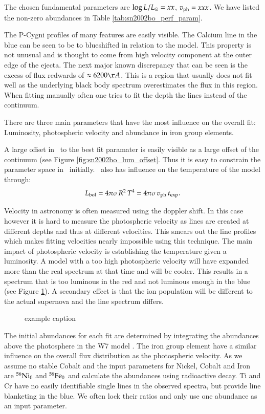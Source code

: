 The chosen fundamental parameters are $\log{L/L_\odot}=xx$, $v_{\rm ph}=xxx$. We have listed the non-zero abundances in Table \ref{tab:sn2002bo_perf_param}. 



The P-Cygni profiles of many features are easily visible. The Calcium line in the blue can be seen to be to blueshifted in relation to the model. This property is not unusual and is thought to come from high velocity component at the outer edge of the ejecta. The next major known discrepancy that can be seen is the excess of flux redwards of  $\approx 6200 \AA$.  This is a region that usually does not fit well as the underlying black body spectrum overestimates the flux in this region. When fitting manually often one tries to fit the depth the lines instead of the continuum.

There are three main parameters that have the most influence on the overall fit: Luminosity, photospheric velocity and abundance in iron group elements.

A large offset in \lum\ to the best fit paramater is easily visible as a large offset of the continuum (see Figure \ref{fig:sn2002bo_lum_offset}. Thus it is easy to constrain the parameter space in \lum\ initially. \lum\ also has influence on the temperature of the model through:
\[
L_{\rm bol} = 4\pi\sigma\, R^2\,T^4 = 4\pi\sigma\,v_{\rm ph}\,t_{\rm exp}.
\label{eq:lum_temp_relation}
\]

Velocity in astronomy is often measured using the doppler shift. In this case however it is hard to measure the photospheric velocity as lines are created at different depths and thus at different velocities. This smears out the line profiles which makes fitting velocities nearly impossible using this technique. 
The main impact of photospheric velocity is establishing the temperature given a luminosity. A model with a too high photospheric velocity will have expanded more than the real spectrum at that time and will be cooler. This results in a spectrum that is too luminous in the red and not luminous enough in the blue (see Figure \ref{fig:sn2002bo_vph_offset}). 
A secondary effect is that the ion population will be different to the actual supernova and the line spectrum differs.
\begin{figure}[htbp] %
   \centering
   \caption{example caption}
   \label{fig:sn2002bo_vph_offset}
\end{figure}
The initial abundances for each fit are determined by integrating the abundances above the photosphere in the W7 model \citep{1984ApJ...286..644N}.
The iron group element have a similar influence on the overall flux distribution as the photospheric velocity. 
As we assume no stable Cobalt and the input parameters for Nickel, Cobalt and Iron are $^{56}\textrm{Ni}_0$ and $^{56}\textrm{Fe}_0$ and calculate the abundances using radioactive decay. Ti and Cr have no easily identifiable single lines in the observed spectra, but provide line blanketing in the blue. We often lock their ratios and only use one abundance as an input parameter. 


